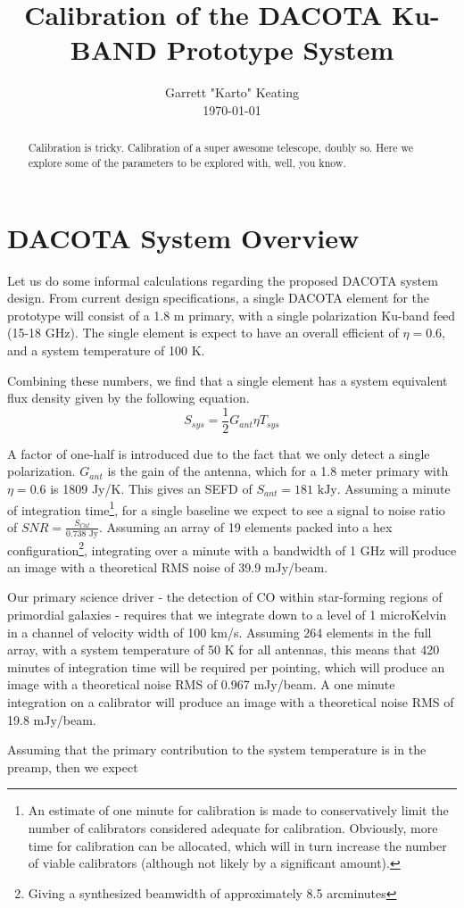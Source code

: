 \documentclass[preprint]{aastex}
\begin{document}
\title{Calibration of the DACOTA Ku-BAND Prototype System}
\author{Garrett "Karto" Keating \\ \today}

\begin{abstract} Calibration is tricky. Calibration of a super awesome telescope, doubly so. Here we explore some of the parameters to be explored with, well, you know.
\end{abstract}

\section{DACOTA System Overview}\label{secoverview}
Let us do some informal calculations regarding the proposed DACOTA system design. From current design specifications, a single DACOTA element for the prototype will consist of a 1.8 m primary, with a single polarization Ku-band feed (15-18 GHz). The single element is expect to have an overall efficient of $\eta=0.6$, and a system temperature of 100 K.

Combining these numbers, we find that a single element has a system equivalent flux density given by the following equation.
\begin{equation} \label{eqsefd}
S_{sys}=\frac{1}{2}G_{ant}{\eta}T_{sys}
\end{equation}

\noindent A factor of one-half is introduced due to the fact that we only detect a single polarization. $G_{ant}$ is the gain of the antenna, which for a 1.8 meter primary with $\eta=0.6$ is 1809 Jy/K. This gives an SEFD of $S_{ant}=181\text{ kJy}$. Assuming a minute of integration time\footnote{An estimate of one minute for calibration is made to conservatively limit the number of calibrators considered adequate for calibration. Obviously, more time for calibration can be allocated, which will in turn increase the number of viable calibrators (although not likely by a significant amount).}, for a single baseline we expect to see a signal to noise ratio of $SNR=\frac{S_{Cal}}{0.738\text{ Jy}}$. Assuming an array of 19 elements packed into a hex configuration\footnote{Giving a synthesized beamwidth of approximately 8.5 arcminutes}, integrating over a minute with a bandwidth of 1 GHz will produce an image with a theoretical RMS noise of 39.9 mJy/beam. 

Our primary science driver - the detection of CO within star-forming regions of primordial galaxies - requires that we integrate down to a level of 1 microKelvin in a channel of velocity width of 100 km/s. Assuming 264 elements in the full array, with a system temperature of 50 K for all antennas, this means that 420 minutes of integration time will be required per pointing, which will produce an image with a theoretical noise RMS of 0.967 mJy/beam. A one minute integration on a calibrator will produce an image with a theoretical noise RMS of 19.8 mJy/beam.

Assuming that the primary contribution to the system temperature is in the preamp, then we expect 
\end{document}
